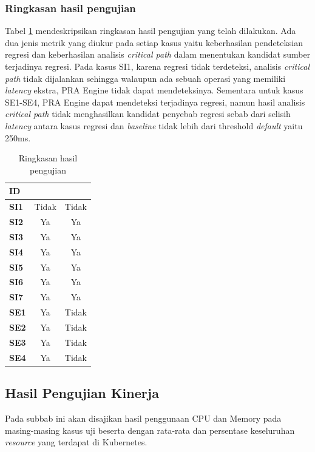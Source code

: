 \subsubsection{Ringkasan hasil pengujian}
Tabel \ref{test-summary} mendeskripsikan ringkasan hasil pengujian yang telah dilakukan. Ada dua jenis metrik yang diukur pada setiap kasus yaitu keberhasilan pendeteksian regresi dan keberhasilan analisis \textit{critical path} dalam menentukan kandidat sumber terjadinya regresi. Pada kasus SI1, karena regresi tidak terdeteksi, analisis \textit{critical path} tidak dijalankan sehingga walaupun ada sebuah operasi yang memiliki \textit{latency} ekstra, PRA Engine tidak dapat mendeteksinya. Sementara untuk kasus SE1-SE4, PRA Engine dapat mendeteksi terjadinya regresi, namun hasil analisis \textit{critical path} tidak menghasilkan kandidat penyebab regresi sebab dari selisih \textit{latency} antara kasus regresi dan \textit{baseline} tidak lebih dari threshold \textit{default} yaitu 250ms.
\begin{table}[htb]
	\caption{Ringkasan hasil pengujian}
	\centering
	\begin{tabular}{|l|c|c|}
		\hline
		\rowcolor[HTML]{3166FF} 
		{\color[HTML]{FFFFFF} ID} &
		\multicolumn{1}{l|}{\cellcolor[HTML]{3166FF}{\color[HTML]{FFFFFF} Regresi terdeteksi}} &
		\multicolumn{1}{l|}{\cellcolor[HTML]{3166FF}{\color[HTML]{FFFFFF} Hasil Critical Path sesuai}} \\ \hline
		\textbf{SI1} & Tidak & Tidak \\ \hline
		\textbf{SI2} & Ya    & Ya    \\ \hline
		\textbf{SI3} & Ya    & Ya    \\ \hline
		\textbf{SI4} & Ya    & Ya    \\ \hline
		\textbf{SI5} & Ya    & Ya    \\ \hline
		\textbf{SI6} & Ya    & Ya    \\ \hline
		\textbf{SI7} & Ya    & Ya    \\ \hline
		\textbf{SE1} & Ya    & Tidak \\ \hline
		\textbf{SE2} & Ya    & Tidak \\ \hline
		\textbf{SE3} & Ya    & Tidak \\ \hline
		\textbf{SE4} & Ya    & Tidak \\ \hline
	\end{tabular}
	\label{test-summary}
\end{table}

\pagebreak

\subsection{Hasil Pengujian Kinerja}
Pada subbab ini akan disajikan hasil penggunaan CPU dan Memory pada masing-masing kasus uji beserta dengan rata-rata dan persentase keseluruhan \textit{resource} yang terdapat di Kubernetes. 
                           
